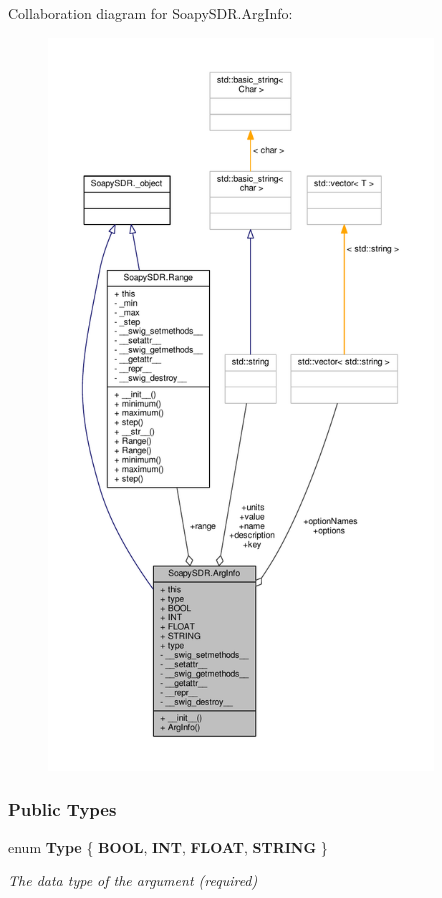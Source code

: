 Collaboration diagram for Soapy\+S\+D\+R.\+Arg\+Info\+:
\nopagebreak
\begin{figure}[H]
\begin{center}
\leavevmode
\includegraphics[height=550pt]{d3/d2c/classSoapySDR_1_1ArgInfo__coll__graph}
\end{center}
\end{figure}
\subsubsection*{Public Types}
\begin{DoxyCompactItemize}
\item 
enum {\bf Type} \{ {\bf B\+O\+OL}, 
{\bf I\+NT}, 
{\bf F\+L\+O\+AT}, 
{\bf S\+T\+R\+I\+NG}
 \}\begin{DoxyCompactList}\small\item\em The data type of the argument (required) \end{DoxyCompactList}
\end{DoxyCompactItemize}
